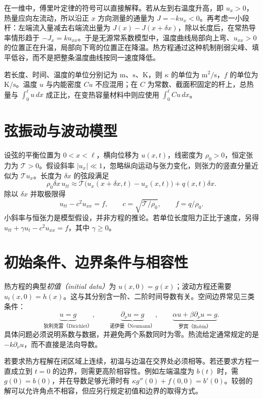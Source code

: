 在一维中，傅里叶定律的符号可以直接解释。若从左到右温度升高，即 $u_x>0$，热量应向左流动，所以沿正 $x$ 方向测量的通量为 $J=-ku_x<0$。再考虑一小段杆：左端流入量减去右端流出量为 $J(x)-J(x+\delta x)$，除以长度后，在常热导率情形趋于 $-J_x=ku_{xx}$。于是无源常系数模型中，温度曲线局部向上弯、$u_{xx}>0$ 的位置正在升温，局部向下弯的位置正在降温。热方程通过这种机制削弱尖峰、填平低谷，而不是把整条温度曲线按同一速度降低。

若长度、时间、温度的单位分别记为 $\mathrm{m}$、$\mathrm{s}$、$\mathrm{K}$，则 $\kappa$ 的单位为 $\mathrm{m}^2/\mathrm{s}$，$f$ 的单位为 $\mathrm{K}/\mathrm{s}$。温度 $u$ 与内能密度 $Cu$ 不应混用；在 $C$ 为常数、截面积固定的杆上，总热量与 $\int_0^\ell u\,dx$ 成正比，在变热容量材料中则应使用 $\int_0^\ell Cu\,dx$。

\section{弦振动与波动模型}
设弦的平衡位置为 $0<x<\ell$，横向位移为 $u(x,t)$，线密度为 $\rho_0>0$，恒定张力为 $\mathcal T>0$。假设斜率 $|u_x|\ll1$，忽略纵向运动与张力变化，则张力的竖直分量近似为 $\mathcal T u_x$。长度为 $\delta x$ 的弦段满足
\[
 \rho_0\delta x\,u_{tt}\approx
 \mathcal T\bigl(u_x(x+\delta x,t)-u_x(x,t)\bigr)+q(x,t)\delta x.
\]
除以 $\delta x$ 并取极限得
\begin{equation}
 u_{tt}-c^2u_{xx}=f,\qquad
 c=\sqrt{\mathcal T/\rho_0},\qquad f=q/\rho_0.
 \label{eq:wave-model}
\end{equation}
小斜率与恒张力是模型假设，并非方程的推论。若单位长度阻力正比于速度，另得 $u_{tt}+\gamma u_t-c^2u_{xx}=f$，其中 $\gamma\ge0$。

\section{初始条件、边界条件与相容性}
热方程的典型\emph{初值（initial data）}为 $u(x,0)=g(x)$；波动方程还需要 $u_t(x,0)=h(x)$。这与其分别含一阶、二阶时间导数有关。空间边界常见三类条件：
\[
 \underbrace{u=g}_{\text{狄利克雷（Dirichlet）}},\qquad
 \underbrace{\partial_\nu u=g}_{\text{诺伊曼（Neumann）}},\qquad
 \underbrace{\alpha u+\beta\partial_\nu u=g}_{\text{罗宾（Robin）}}.
\]
具体问题必须说明系数与数据，并避免两个系数同时为零。热流给定通常规定的是 $-k\partial_\nu u$，而不直接是法向导数。

若要求热方程解在闭区域上连续，初温与边温在交界处必须相等。若还要求方程一直成立到 $t=0$ 的边界，则需更高阶相容性。例如左端温度为 $b(t)$ 时，需 $g(0)=b(0)$，并在导数足够光滑时有 $\kappa g''(0)+f(0,0)=b'(0)$。较弱的解可以允许角点不相容，但应另行规定初值和边界的取得方式。


